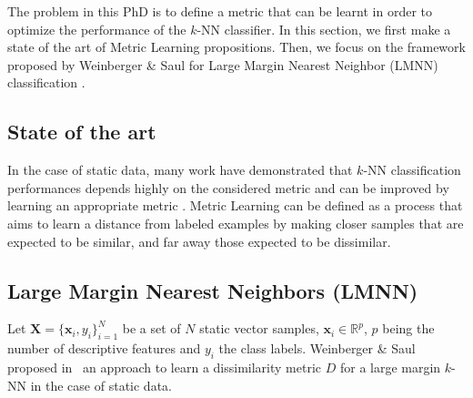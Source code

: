 The problem in this PhD is to define a metric that can be learnt in order to optimize the performance of the $k$-NN classifier. In this section, we first make a state of the art of Metric Learning propositions. Then, we focus on the framework proposed by Weinberger \& Saul for Large Margin Nearest Neighbor (LMNN) classification \cite{Weinberger2009}.

\subsection{State of the art}
In the case of static data, many work have demonstrated that $k$-NN classification performances depends highly on the considered metric and can be improved by learning an appropriate metric \cite{Shental2002,Goldberger2004,Chopra2005}. Metric Learning can be defined as a process that aims to learn a distance from labeled examples by making closer samples that are expected to be similar, and far away those expected to be dissimilar.

%


\subsection{Large Margin Nearest Neighbors (LMNN)}
Let $\textbf{X}=\{\textbf{x}_i,y_i\}_{i=1}^N$ be a set of $N$ static vector samples, ${\textbf{x}_i \in \mathbb{R}^{p}}$, $p$ being the number of descriptive features and $y_i$ the class labels. Weinberger \& Saul proposed in~\cite{Weinberger2009} an approach to learn a dissimilarity metric $D$ for a large margin $k$-NN in the case of static data. 

